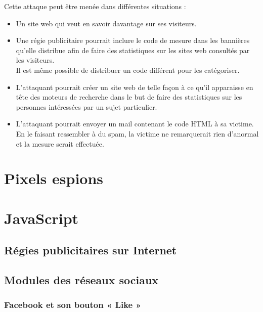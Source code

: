 
Cette attaque peut être menée dans différentes situations :
\begin{itemize}
  \item Un site web qui veut en savoir davantage sur ses visiteurs.
  \item Une régie publicitaire pourrait inclure le code de mesure dans les bannières qu'elle distribue afin de faire des statistiques sur les sites web consultés par les visiteurs.\\Il est même possible de distribuer un code différent pour les catégoriser.
  \item L'attaquant pourrait créer un site web de telle façon à ce qu'il apparaisse en tête des moteurs de recherche dans le but de faire des statistiques sur les personnes intéressées par un sujet particulier.
  \item L'attaquant pourrait envoyer un mail contenant le code HTML à sa victime.\\En le faisant ressembler à du spam, la victime ne remarquerait rien d'anormal et la mesure serait effectuée.
\end{itemize}


\section{Pixels espions}
\section{JavaScript}
	\subsection{Régies publicitaires sur Internet}
		
	\subsection{Modules des réseaux sociaux}
		
		\subsubsection{Facebook et son bouton « Like »}
			
